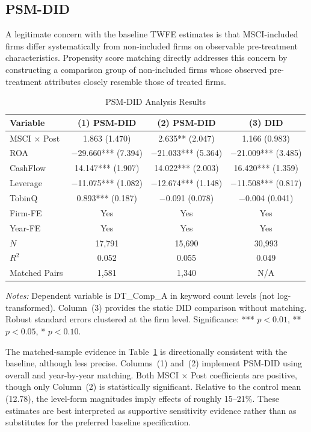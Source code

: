 \subsection{PSM-DID}

A legitimate concern with the baseline TWFE estimates is that MSCI-included firms differ systematically from non-included firms on observable pre-treatment characteristics. Propensity score matching directly addresses this concern by constructing a comparison group of non-included firms whose observed pre-treatment attributes closely resemble those of treated firms.

\begin{table}[htbp]
\centering
\caption{PSM-DID Analysis Results}
\label{tab:psm_did}
\small
\begin{tabular}{lccc}
\toprule
\textbf{Variable} & \textbf{(1) PSM-DID} & \textbf{(2) PSM-DID} & \textbf{(3) DID} \\
\midrule
MSCI $\times$ Post & 1.863 (1.470) & 2.635** (2.047) & 1.166 (0.983) \\
ROA & $-$29.660*** (7.394) & $-$21.033*** (5.364) & $-$21.009*** (3.485) \\
CashFlow & 14.147*** (1.907) & 14.022*** (2.003) & 16.420*** (1.359) \\
Leverage & $-$11.075*** (1.082) & $-$12.674*** (1.148) & $-$11.508*** (0.817) \\
TobinQ & 0.893*** (0.187) & $-$0.091 (0.078) & $-$0.004 (0.041) \\
Firm-FE & Yes & Yes & Yes \\
Year-FE & Yes & Yes & Yes \\
$N$ & 17,791 & 15,690 & 30,993 \\
$R^2$ & 0.052 & 0.055 & 0.049 \\
Matched Pairs & 1,581 & 1,340 & N/A \\
\bottomrule
\end{tabular}
\begin{tablenotes}
\small
\item \textit{Notes:} Dependent variable is DT\_Comp\_A in keyword count levels (not log-transformed). Column~(3) provides the static DID comparison without matching. Robust standard errors clustered at the firm level. Significance: *** $p < 0.01$, ** $p < 0.05$, * $p < 0.10$.
\end{tablenotes}
\end{table}

The matched-sample evidence in Table~\ref{tab:psm_did} is directionally consistent with the baseline, although less precise. Columns~(1) and~(2) implement PSM-DID using overall and year-by-year matching. Both MSCI $\times$ Post coefficients are positive, though only Column~(2) is statistically significant. Relative to the control mean (12.78), the level-form magnitudes imply effects of roughly 15--21\%. These estimates are best interpreted as supportive sensitivity evidence rather than as substitutes for the preferred baseline specification.

